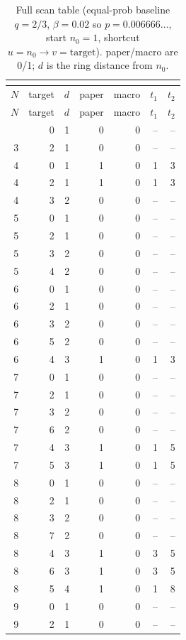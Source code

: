 \begin{longtable}{rrrrrrr}
\caption{Full scan table (equal-prob baseline $q=2/3$, $\beta=0.02$ so $p=0.006666\ldots$, start $n_0=1$, shortcut $u=n_0\to v=\mathrm{target}$). paper/macro are 0/1; $d$ is the ring distance from $n_0$.}\\
\label{tab:fullscan-en}\\
\toprule
$N$ & target & $d$ & paper & macro & $t_1$ & $t_2$\\
\midrule
\endfirsthead
\toprule
$N$ & target & $d$ & paper & macro & $t_1$ & $t_2$\\
\midrule
\endhead
\bottomrule
\endfoot
3 & 0 & 1 & 0 & 0 & -- & --\\
3 & 2 & 1 & 0 & 0 & -- & --\\
4 & 0 & 1 & 1 & 0 & 1 & 3\\
4 & 2 & 1 & 1 & 0 & 1 & 3\\
4 & 3 & 2 & 0 & 0 & -- & --\\
5 & 0 & 1 & 0 & 0 & -- & --\\
5 & 2 & 1 & 0 & 0 & -- & --\\
5 & 3 & 2 & 0 & 0 & -- & --\\
5 & 4 & 2 & 0 & 0 & -- & --\\
6 & 0 & 1 & 0 & 0 & -- & --\\
6 & 2 & 1 & 0 & 0 & -- & --\\
6 & 3 & 2 & 0 & 0 & -- & --\\
6 & 5 & 2 & 0 & 0 & -- & --\\
6 & 4 & 3 & 1 & 0 & 1 & 3\\
7 & 0 & 1 & 0 & 0 & -- & --\\
7 & 2 & 1 & 0 & 0 & -- & --\\
7 & 3 & 2 & 0 & 0 & -- & --\\
7 & 6 & 2 & 0 & 0 & -- & --\\
7 & 4 & 3 & 1 & 0 & 1 & 5\\
7 & 5 & 3 & 1 & 0 & 1 & 5\\
8 & 0 & 1 & 0 & 0 & -- & --\\
8 & 2 & 1 & 0 & 0 & -- & --\\
8 & 3 & 2 & 0 & 0 & -- & --\\
8 & 7 & 2 & 0 & 0 & -- & --\\
8 & 4 & 3 & 1 & 0 & 3 & 5\\
8 & 6 & 3 & 1 & 0 & 3 & 5\\
8 & 5 & 4 & 1 & 0 & 1 & 8\\
9 & 0 & 1 & 0 & 0 & -- & --\\
9 & 2 & 1 & 0 & 0 & -- & --\\

\end{longtable}
